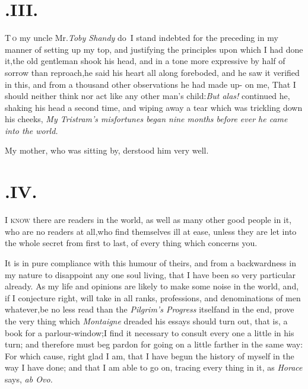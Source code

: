\documentclass{article}
\begin{document}
\section{.\enspace III.}

\lettrine{T}{\,o} my uncle Mr.\@ \textit{Toby Shandy} do~I\break
stand indebted for the preceding\break
{}
\break
in my manner of
setting up my top, and justifying the principles upon which I had
done it,\tsk  the old gentleman shook his head, and in a tone more
expressive by half of sorrow than reproach,\tsk  he said his heart
all along foreboded, and he saw it verified in this, and from a
thousand other observations he had made up- on me, That I should
neither think nor act like any other man’s
child:\tsk  \textit{But alas!} continued he, shaking his head a
second time, and wiping away a tear which was trickling down his
cheeks, \textit{My Tristram’s misfortunes began nine months before
ever he came into the world.}

\tsh My mother, who was sitting by,\break
{}
derstood him very well.

\section{.\enspace IV.}

\lettrine{I}{ know} there are readers in the
world, as well as many other good people in it, who are no readers
at all,\tsk  who find themselves ill at ease, unless they are let
into the whole secret from first to last, of every thing which
concerns you.

It is in pure compliance with this humour of theirs, and from a
backwardness in my nature to disappoint any one soul living, that I
have been so very particular already. As my life and opinions are
likely to make some noise in the world, and, if I conjecture right,
will take in all ranks, professions, and denominations of men
whatever,\tsk  be no less read than the \textit{Pilgrim’s
Progress} itself\tsk  and in the end, prove the very thing
which \textit{Montaigne} dreaded his essays should turn out, that is,
a book for a parlour-window;\tsk  I find it necessary to consult
every one a little in his turn; and therefore must beg pardon for going on a little farther in the same way:
For which cause, right glad I am, that I have begun the history of
myself in the way I have done; and that I am able to go on, tracing
every thing in it, as \textit{Horace} says, \textit{ab Ovo.}
\end{document}
